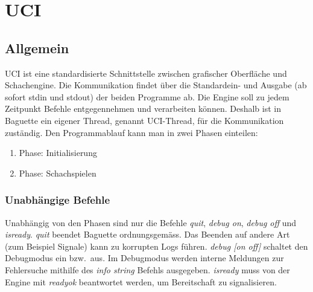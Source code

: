 \def \citeuci[#1]{\cite[l. #1]{uci}}
\section{UCI}\label{sec:uci}
\subsection{Allgemein}\label{subsec:allgemein}
UCI ist eine standardisierte Schnittstelle zwischen grafischer Oberfl\"ache und Schachengine.
Die Kommunikation findet \"uber die Standardein- und Ausgabe (ab sofort stdin und stdout) der beiden Programme ab.\citeuci[9]
\newline
Die Engine soll zu jedem Zeitpunkt Befehle entgegennehmen und verarbeiten k\"onnen.\citeuci[15]
Deshalb ist in Baguette ein eigener Thread, genannt UCI-Thread, f\"ur die Kommunikation zust\"andig.
\newline
Den Programmablauf kann man in zwei Phasen einteilen:
\begin{enumerate}
    \item Phase: Initialisierung
    \item Phase: Schachspielen
\end{enumerate}
\subsubsection{Unabh\"angige Befehle}
Unabh\"angig von den Phasen sind nur die Befehle \textit{quit}, \textit{debug on}, \textit{debug off} und \textit{isready}.
\newline\textit{quit} beendet Baguette ordnungsgem\"ass.
Das Beenden auf andere Art (zum Beispiel Signale) kann zu korrupten Logs f\"uhren.
\newline \textit{debug [on off]} schaltet den Debugmodus ein bzw.\  aus.
Im Debugmodus werden interne Meldungen zur Fehlersuche mithilfe des \textit{info string} Befehls ausgegeben.
\newline \textit{isready} muss von der Engine mit \textit{readyok} beantwortet werden, um Bereitschaft zu signalisieren.
